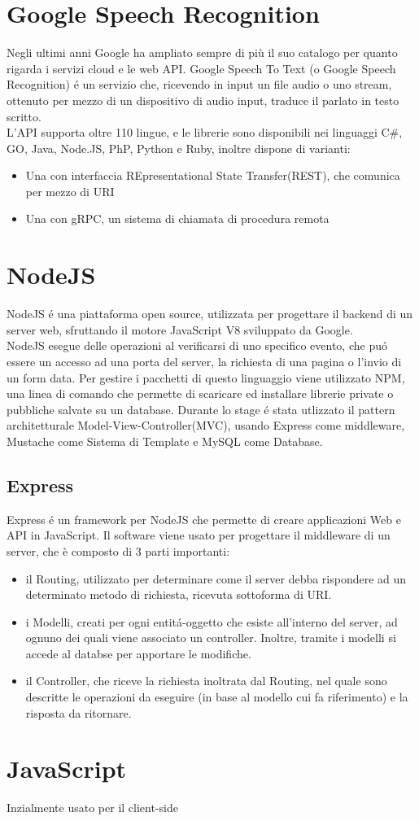 \section{Google Speech Recognition}
Negli ultimi anni Google ha ampliato sempre di più il suo catalogo per quanto rigarda
i servizi cloud e le web API. Google Speech To Text (o Google Speech Recognition) \'e un
servizio che, ricevendo in input un file audio o uno stream, ottenuto per mezzo di un
dispositivo di audio input, traduce il parlato in testo scritto.\\
L'API supporta oltre 110 lingue, e le librerie sono disponibili nei linguaggi C\#, GO, Java, Node.JS,
PhP, Python e Ruby, inoltre dispone di varianti:
\begin{itemize}
\item Una con interfaccia REpresentational State Transfer(REST), che comunica per mezzo di URI
\item Una con gRPC, un sistema di chiamata di procedura remota
\end{itemize}

\section{NodeJS}
NodeJS \'e una piattaforma open source, utilizzata per progettare il backend di un server web, sfruttando
il motore JavaScript V8 sviluppato da Google.\\
NodeJS esegue delle operazioni al verificarsi di uno specifico evento, che pu\'o essere un accesso ad una porta
del server, la richiesta di una pagina o l'invio di un form data.
Per gestire i pacchetti di questo linguaggio viene utilizzato NPM\cite{NPM}, una linea di comando che permette
di scaricare ed installare librerie private o pubbliche salvate su un database.
Durante lo stage \'e stata utlizzato il pattern architetturale Model-View-Controller(MVC), usando Express
come middleware, Mustache come Sistema di Template e MySQL come Database.

\subsection{Express}
Express \'e un framework per NodeJS che permette di creare applicazioni Web e API in JavaScript.
Il software viene usato per progettare il middleware di un server, che è composto di 3 parti importanti:
\begin{itemize}
\item il Routing, utilizzato per determinare come il server debba rispondere ad un determinato metodo di richiesta,
ricevuta sottoforma di URI.
\item i Modelli, creati per ogni entit\'a-oggetto che esiste all'interno del server, ad ognuno dei quali viene associato
un controller. Inoltre, tramite i modelli si accede al databse per apportare le modifiche.
\item il Controller, che riceve la richiesta inoltrata dal Routing, nel quale sono descritte le operazioni da eseguire
(in base al modello cui fa riferimento) e la risposta da ritornare.
\end{itemize}




\section{JavaScript}
Inzialmente usato per il client-side
